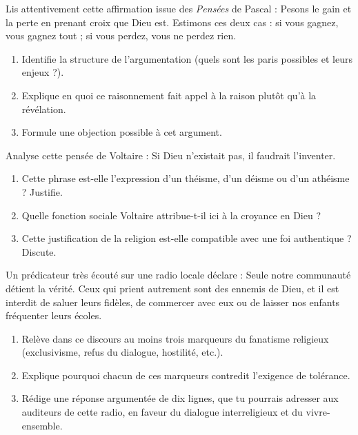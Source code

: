 \documentclass[11pt]{article}
\begin{document}
\begin{exercice}
Lis attentivement cette affirmation issue des \emph{Pensées} de Pascal : \guillemotleft Pesons le gain et la perte en prenant croix que Dieu est. Estimons ces deux cas : si vous gagnez, vous gagnez tout ; si vous perdez, vous ne perdez rien. \guillemotright
\begin{enumerate}
\item Identifie la structure de l'argumentation (quels sont les paris possibles et leurs enjeux ?).
\item Explique en quoi ce raisonnement fait appel à la raison plutôt qu'à la révélation.
\item Formule une objection possible à cet argument.
\end{enumerate}
\end{exercice}

\begin{exercice}
Analyse cette pensée de Voltaire : \guillemotleft Si Dieu n'existait pas, il faudrait l'inventer. \guillemotright
\begin{enumerate}
\item Cette phrase est-elle l'expression d'un théisme, d'un déisme ou d'un athéisme ? Justifie.
\item Quelle fonction sociale Voltaire attribue-t-il ici à la croyance en Dieu ?
\item Cette justification de la religion est-elle compatible avec une foi authentique ? Discute.
\end{enumerate}
\end{exercice}

\begin{exercice}
Un prédicateur très écouté sur une radio locale déclare : \guillemotleft Seule notre communauté détient la vérité. Ceux qui prient autrement sont des ennemis de Dieu, et il est interdit de saluer leurs fidèles, de commercer avec eux ou de laisser nos enfants fréquenter leurs écoles. \guillemotright
\begin{enumerate}
\item Relève dans ce discours au moins trois marqueurs du fanatisme religieux (exclusivisme, refus du dialogue, hostilité, etc.).
\item Explique pourquoi chacun de ces marqueurs contredit l'exigence de tolérance.
\item Rédige une réponse argumentée de dix lignes, que tu pourrais adresser aux auditeurs de cette radio, en faveur du dialogue interreligieux et du vivre-ensemble.
\end{enumerate}
\end{exercice}
\end{document}
